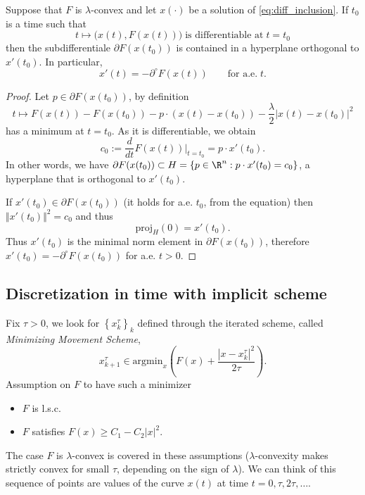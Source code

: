 \begin{thm} Suppose that $F$ is $\lambda$-convex and let $x(\cdot)$ be a solution of \eqref{eq:diff_inclusion}. If $t_0$ is a time such that 
\begin{equation*}
    t\mapsto \big(x(t), F(x(t))\big) \;\text{is differentiable at}\;t=t_0
\end{equation*}
then the subdifferentiale $\partial F(x(t_0))$ is contained in a hyperplane orthogonal to $x'(t_0)$. In particular, 
\begin{equation*}
    x'(t) = -\partial^\circ F(x(t)) \qquad\text{for a.e.}\;t.   
\end{equation*}
\end{thm}

\begin{proof} Let $p\in \partial F(x(t_0))$, by definition
\begin{equation*}
    t\mapsto F(x(t)) - F(x(t_0)) - p\cdot \left(x(t)-x(t_0)\right) - \frac{\lambda}{2}\left|x(t) - x(t_0)\right|^2
\end{equation*}
has a minimum at $t=t_0$. As it is differentiable, we obtain
\begin{equation*}
    c_0 := \frac{d}{dt}F(x(t))\Big|_{t=t_0}  = p\cdot x'(t_0).
\end{equation*}
In other words, we have $\partial F(x(t_0))\subset H = \{p\in \R^n: p\cdot x'(t_0) = c_0 \}$, a hyperplane that is orthogonal to $x'(t_0)$. 

If $x'(t_0)\in \partial F(x(t_0))$ (it holds for a.e. $t_0$, from the equation) then $\Vert x'(t_0)\Vert^2 = c_0$ and thus 
\begin{equation*}
    \mathrm{proj}_H(0) = x'(t_0).
\end{equation*}
Thus $x'(t_0)$ is the minimal norm element in $\partial F(x(t_0))$, therefore $x'(t_0) = -\partial^\circ F(x(t_0))$ for a.e. $t>0$.
\end{proof}
\subsection{Discretization in time with implicit scheme} Fix $\tau > 0$, we look for $\left\{x_k^\tau\right\}_{k}$ defined through the iterated scheme, called \emph{Minimizing Movement Scheme},
\begin{equation}\label{eq:MMS}
    x^\tau_{k+1} \in \mathrm{argmin}_{x}\left( F(x) + \frac{|x-x_k^\tau|^2}{2\tau}\right).
\end{equation}
Assumption on $F$ to have such a minimizer
\begin{itemize}
    \item $F$ is l.s.c. 
    \item $F$ satisfies $F(x)\geq C_1-C_2|x|^2$.
\end{itemize}
The case $F$ is $\lambda$-convex is covered in these assumptions ($\lambda$-convexity makes strictly convex for small $\tau$, depending on the sign of $\lambda$). We can think of this sequence of points are values of the curve $x(t)$ at time $t=0,\tau, 2\tau, \ldots$.

